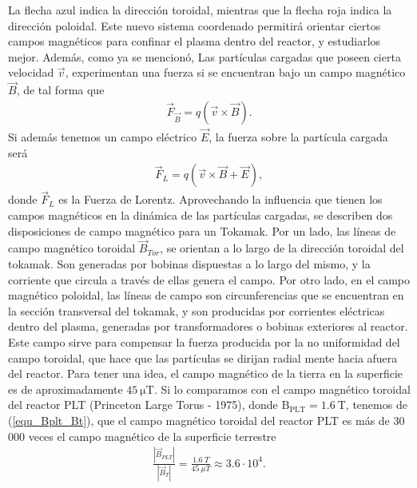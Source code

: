 \documentclass[../main.tex]{subfiles}
\begin{document}
        La flecha azul indica la dirección toroidal, mientras que la flecha roja indica la dirección poloidal. Este nuevo sistema coordenado permitirá orientar ciertos campos magnéticos para confinar el plasma dentro del reactor, y estudiarlos mejor. Además, como ya se mencionó, Las partículas cargadas que poseen cierta velocidad $\vec v$, experimentan una fuerza si se encuentran bajo un campo magnético $\vec B$, de tal forma que
        \begin{align}
            \vec F_{\vec B} = q\left( \vec v \times \vec B \right).
        \end{align}
        Si además tenemos un campo eléctrico $\vec E$, la fuerza sobre la partícula cargada será
        \begin{align}
            \vec F_L = q\left( \vec v \times \vec B + \vec E \right),
        \end{align}
        donde $\vec F_L$ es la Fuerza de Lorentz. Aprovechando la influencia que tienen los campos magnéticos en la dinámica de las partículas cargadas, se describen dos disposiciones
        de campo magnético para un Tokamak. Por un lado, las líneas de campo magnético toroidal $\vec{B}_{Tor}$, se orientan a lo largo de la dirección toroidal del tokamak. Son generadas por
        bobinas dispuestas a lo largo del mismo, y la corriente que circula a través de ellas genera el campo. Por otro lado, en el campo magnético poloidal, las líneas de campo son circunferencias que se encuentran en la sección transversal del tokamak, y son producidas por corrientes eléctricas dentro del plasma, generadas por transformadores o bobinas exteriores al reactor. Este campo sirve para compensar la fuerza producida por la no uniformidad del campo toroidal, que hace que las partículas se dirijan radial mente hacia afuera del reactor. Para tener una idea, el campo magnético de la tierra en la superficie es de aproximadamente $\mathrm{45 \ \mu T}$. Si lo comparamos con el campo magnético toroidal del
        reactor PLT (Princeton Large Torus - 1975), donde $\mathrm{ B_{PLT}  = 1.6 \ T}$, tenemos de (\ref{equ_Bplt_Bt}), que el campo magnético toroidal del reactor PLT es más de 30 000 veces el campo magnético de la superficie terrestre
        \begin{align} \label{equ_Bplt_Bt}
            \frac{\left| \vec B_{PLT} \right| }{\left|  \vec B_{T} \right|} = \frac{1.6 \ T}{45 \ \mu T} \approx 3.6 \cdot 10^4.
        \end{align}
        
\end{document}
